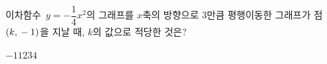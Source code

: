 이차함수~$y=-\dfrac{1}{4}x^2$의 그래프를 $x$축의 방향으로 $3$만큼 평행이동한 그래프가 점~$(k{,}\mkern3mu -1)$을 지날 때, $k$의 값으로 적당한 것은?
\begin{choices32}{$-1$}{$1$}{$2$}{$3$}{$4$}\end{choices32}
